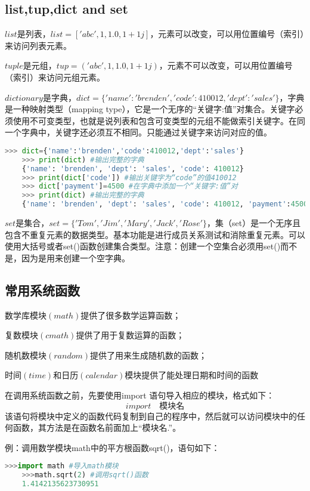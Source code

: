 \documentclass[11pt,a4paper]{article}
\begin{document}
\subsection{list,tup,dict and set}
$list$是列表，$list=['abc',1,1.0,1+1j]$，元素可以改变，可以用位置编号（索引）来访问列表元素。

$tuple$是元组，$tup=('abc',1,1.0,1+1j)$，元素不可以改变，可以用位置编号（索引）来访问元组元素。

$dictionary$是字典，$dict=\{'name':'brenden','code':410012,'dept':'sales'\}$，字典是一种映射类型（mapping type），它是一个无序的“关键字:值”对集合。关键字必须使用不可变类型，也就是说列表和包含可变类型的元组不能做索引关键字。在同一个字典中，关键字还必须互不相同。只能通过关键字来访问对应的值。

\begin{lstlisting}[language={Python}]
    >>> dict={'name':'brenden','code':410012,'dept':'sales'}
    >>> print(dict) #输出完整的字典
    {'name': 'brenden', 'dept': 'sales', 'code': 410012}
    >>> print(dict['code']) #输出关键字为“code”的值410012
    >>> dict['payment']=4500 #在字典中添加一个“关键字:值”对
    >>> print(dict) #输出完整的字典
    {'name': 'brenden', 'dept': 'sales', 'code': 410012, 'payment':4500}
\end{lstlisting}

$set$是集合，$set=\{'Tom','Jim','Mary','Jack','Rose'\}$，集（set）是一个无序且包含不重复元素的数据类型。基本功能是进行成员关系测试和消除重复元素。可以使用大括号或者set()函数创建集合类型。注意：创建一个空集合必须用set()而不是{}，因为{}是用来创建一个空字典。

\subsection{常用系统函数}
数学库模块$(math)$提供了很多数学运算函数；

复数模块$(cmath)$提供了用于复数运算的函数；

随机数模块$(random)$提供了用来生成随机数的函数；

时间$(time)$和日历$(calendar)$模块提供了能处理日期和时间的函数

在调用系统函数之前，先要使用import 语句导入相应的模块，格式如下：$$import \quad \mbox{模块名}$$
该语句将模块中定义的函数代码复制到自己的程序中，然后就可以访问模块中的任何函数，其方法是在函数名前面加上“模块名.”。

例：调用数学模块math中的平方根函数sqrt()，语句如下：

\begin{lstlisting}[language={Python}]
    >>>import math #导入math模块
    >>>math.sqrt(2) #调用sqrt()函数
    1.4142135623730951
\end{lstlisting}
\end{document}
